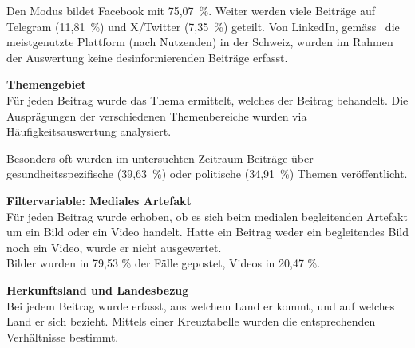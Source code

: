 \documentclass[12pt,a4paper]{article}        %
\begin{document}
Den Modus bildet Facebook mit 75,07 \%. Weiter werden viele Beiträge auf Telegram (11,81 \%) und X/Twitter (7,35 \%) geteilt. Von LinkedIn, gemäss~\cite{we_are_social_fuhrende_2025}  die meistgenutzte Plattform (nach Nutzenden) in der Schweiz, wurden im Rahmen der Auswertung keine desinformierenden Beiträge erfasst.

\textbf{Themengebiet}\\
Für jeden Beitrag wurde das Thema ermittelt, welches der Beitrag behandelt. Die Ausprägungen der verschiedenen Themenbereiche wurden via Häufigkeitsauswertung analysiert.

\begin{table}[H]
  \label{tab:results_post_topic}
  \centering
  \caption{Relative Häufigkeitsverteilung der Themengebiete der Beiträge in \%.}
\end{table}
Besonders oft wurden im untersuchten Zeitraum Beiträge über gesundheitsspezifische (39,63 \%) oder politische (34,91 \%) Themen veröffentlicht.

\textbf{Filtervariable: Mediales Artefakt}\\
Für jeden Beitrag wurde erhoben, ob es sich beim medialen begleitenden Artefakt um ein Bild oder ein Video handelt. Hatte ein Beitrag weder ein begleitendes Bild noch ein Video, wurde er nicht ausgewertet. \\
Bilder wurden in 79,53 \% der Fälle gepostet, Videos in 20,47 \%.

\textbf{Herkunftsland und Landesbezug}\\
Bei jedem Beitrag wurde erfasst, aus welchem Land er kommt, und auf welches Land er sich bezieht. Mittels einer Kreuztabelle wurden die entsprechenden Verhältnisse bestimmt.
\end{document}
